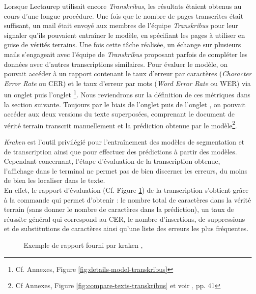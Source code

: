 Lorsque Lectaurep utilisait encore \textit{Transkribus}, les résultats étaient obtenus au cours d'une longue procédure. Une fois que le nombre de pages transcrites était suffisant, un mail était envoyé aux membres de l'équipe \textit{Transkribus} pour leur signaler qu'ils pouvaient entraîner le modèle, en spécifiant les pages à utiliser en guise de vérités terrains. Une fois cette tâche réalisée, un échange sur plusieurs mails s'engageait avec l'équipe de \textit{Transkribus} proposant parfois de compléter les données avec d'autres transcriptions similaires. Pour évaluer le modèle, on pouvait accéder à un rapport contenant le taux d'erreur par caractères (\textit{Character Error Rate} ou CER) et le taux d'erreur par mots (\textit{Word Error Rate} ou WER) via un onglet  puis l'onglet \footnote{Cf. Annexes, Figure \ref{fig:details-model-transkribus}}. Nous reviendrons sur la définition de ces métriques dans la section suivante. 
Toujours par le biais de l'onglet  puis de l'onglet , on pouvait accéder aux deux versions du texte superposées, comprenant le document de vérité terrain transcrit manuellement et la prédiction obtenue par le modèle\footnote{Cf Annexes, Figure \ref{fig:compare-texts-transkribus} et voir \cite{bonhomme_defis_2018}, pp. 41}.

\textit{Kraken} est l'outil privilégié pour l'entraînement des modèles de segmentation et de transcription ainsi que pour effectuer des prédictions à partir des modèles. Cependant concernant, l'étape d'évaluation de la transcription obtenue, l'affichage dans le terminal ne permet pas de bien discerner les erreurs, du moins de bien les localiser dans le texte.\\

En effet, le rapport d'évaluation (Cf. Figure \ref{fig:rapport_Kraken}) de la transcription s'obtient grâce à la commande  qui permet d'obtenir : le nombre total de caractères dans la vérité terrain (sans donner le nombre de caractères dans la prédiction), un taux de réussite général qui correspond au CER, le nombre d'insertions, de suppressions et de substitutions de caractères ainsi qu'une liste des erreurs les plus fréquentes.

\begin{figure}[h]
    \centering
    \centerline{}
    \caption{Exemple de rapport fourni par kraken , \cite{noauthor_kraken_nodate}}
    \label{fig:rapport_Kraken}
\end{figure} 

